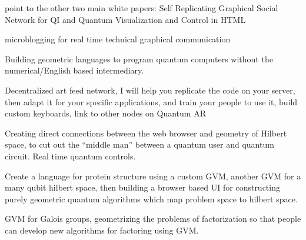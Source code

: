 \documentclass[11pt]{article}
\begin{document}
point to the other two main white papers: 
    Self Replicating Graphical Social Network for QI and 
    Quantum Visualization and Control in HTML

    microblogging for real time technical graphical communication




    Building geometric languages to program quantum computers without the numerical/English based intermediary.




    Decentralized art feed network, I will help you replicate the code on your server, then adapt it for your specific applications, and train your people to use it, build custom keyboards, link to other nodes on Quantum AR





Creating direct connections between the web browser and geometry of Hilbert space, to cut out the ``middle man'' between a quantum user and quantum circuit.  Real time quantum controls.    


    Create a language for protein structure using a custom GVM, another GVM for a many qubit hilbert space, then building a browser based UI for constructing purely geometric quantum algorithms which map problem space to hilbert space.  


    GVM for Galois groups, geometrizing the problems of factorization so that people can develop new algorithms for factoring using GVM.
\end{document}
